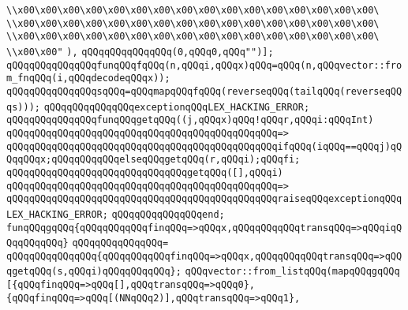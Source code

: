 \verb|\\x00\x00\x00\x00\x00\x00\x00\x00\x00\x00\x00\x00\x00\x00\x00\x00\|\newline
\verb|\\x00\x00\x00\x00\x00\x00\x00\x00\x00\x00\x00\x00\x00\x00\x00\x00\|\newline
\verb|\\x00\x00\x00\x00\x00\x00\x00\x00\x00\x00\x00\x00\x00\x00\x00\x00\|\newline
\verb|\\x00\x00"|\newline
\verb|),|\newline
\verb|qQQqqQQqqQQqqQQq(0,qQQq0,qQQq"")];|\newline
\verb|qQQqqQQqqQQqqQQqfunqQQqfqQQq(n,qQQqi,qQQqx)qQQq=qQQq(n,qQQqvector::from_fnqQQq(i,qQQqdecodeqQQqx));|\newline
\verb|qQQqqQQqqQQqqQQqsqQQq=qQQqmapqQQqfqQQq(reverseqQQq(tailqQQq(reverseqQQqs)));|\newline
\verb|qQQqqQQqqQQqqQQqexceptionqQQqLEX_HACKING_ERROR;|\newline
\verb|qQQqqQQqqQQqqQQqfunqQQqgetqQQq((j,qQQqx)qQQq!qQQqr,qQQqi:qQQqInt)|\newline
\verb|qQQqqQQqqQQqqQQqqQQqqQQqqQQqqQQqqQQqqQQqqQQqqQQq=>|\newline
\verb|qQQqqQQqqQQqqQQqqQQqqQQqqQQqqQQqqQQqqQQqqQQqqQQqifqQQq(iqQQq==qQQqj)qQQqqQQqx;qQQqqQQqqQQqelseqQQqgetqQQq(r,qQQqi);qQQqfi;|\newline
\newline
\verb|qQQqqQQqqQQqqQQqqQQqqQQqqQQqqQQqgetqQQq([],qQQqi)|\newline
\verb|qQQqqQQqqQQqqQQqqQQqqQQqqQQqqQQqqQQqqQQqqQQqqQQq=>|\newline
\verb|qQQqqQQqqQQqqQQqqQQqqQQqqQQqqQQqqQQqqQQqqQQqqQQqraiseqQQqexceptionqQQqLEX_HACKING_ERROR;|\newline
\verb|qQQqqQQqqQQqqQQqend;|\newline
\verb|funqQQqgqQQq{qQQqqQQqqQQqfinqQQq=>qQQqx,qQQqqQQqqQQqtransqQQq=>qQQqiqQQqqQQqqQQq}|\newline
\verb|qQQqqQQqqQQqqQQq=|\newline
\verb|qQQqqQQqqQQqqQQq{qQQqqQQqqQQqfinqQQq=>qQQqx,qQQqqQQqqQQqtransqQQq=>qQQqgetqQQq(s,qQQqi)qQQqqQQqqQQq};|\newline
\verb|qQQqvector::from_listqQQq(mapqQQqgqQQq|\newline
\verb|[{qQQqfinqQQq=>qQQq[],qQQqtransqQQq=>qQQq0},|\newline
\verb|{qQQqfinqQQq=>qQQq[(NNqQQq2)],qQQqtransqQQq=>qQQq1},|\newline
